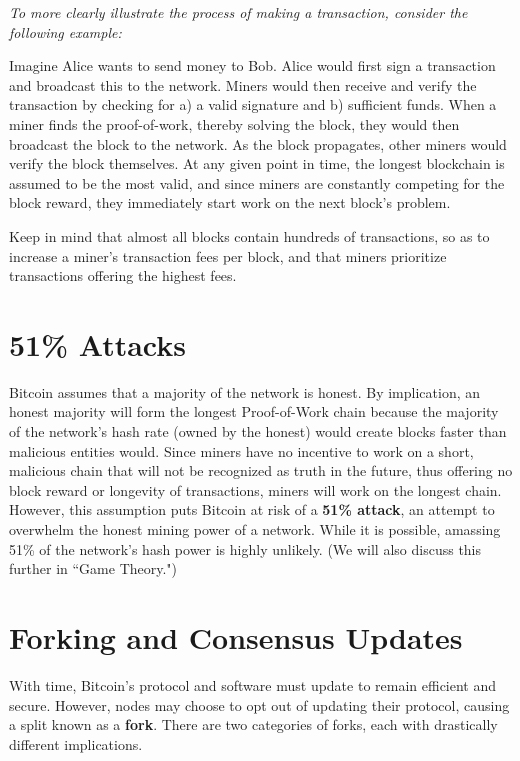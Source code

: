 \documentclass[full.tex]{subfiles}
\begin{document}
   \textit{To more clearly illustrate the process of making a transaction, consider the following example:}
   
   Imagine Alice wants to send money to Bob. Alice would first sign a transaction and broadcast this to the network. Miners would then receive and verify the transaction by checking for a) a valid signature and b) sufficient funds. When a miner finds the proof-of-work, thereby solving the block, they would then broadcast the block to the network. As the block propagates, other miners would verify the block themselves. At any given point in time, the longest blockchain is assumed to be the most valid, and since miners are constantly competing for the block reward, they immediately start work on the next block's problem.
   
   Keep in mind that almost all blocks contain hundreds of transactions, so as to increase a miner's transaction fees per block, and that miners prioritize transactions offering the highest fees.
   
   \section*{51\% Attacks}
   
   Bitcoin assumes that a majority of the network is honest. By implication, an honest majority will form the longest Proof-of-Work chain because the majority of the network's hash rate (owned by the honest) would create blocks faster than malicious entities would. Since miners have no incentive to work on a short, malicious chain that will not be recognized as truth in the future, thus offering no block reward or longevity of transactions, miners will work on the longest chain. However, this assumption puts Bitcoin at risk of a \textbf{51\% attack}, an attempt to overwhelm the honest mining power of a network. While it is possible, amassing 51\% of the network's hash power is highly unlikely. (We will also discuss this further in ``Game Theory.")
   
   \section*{Forking and Consensus Updates}
   
   With time, Bitcoin's protocol and software must update to remain efficient and secure. However, nodes may choose to opt out of updating their protocol, causing a split known as a \textbf{fork}. There are two categories of forks, each with drastically different implications.
   
\end{document}
